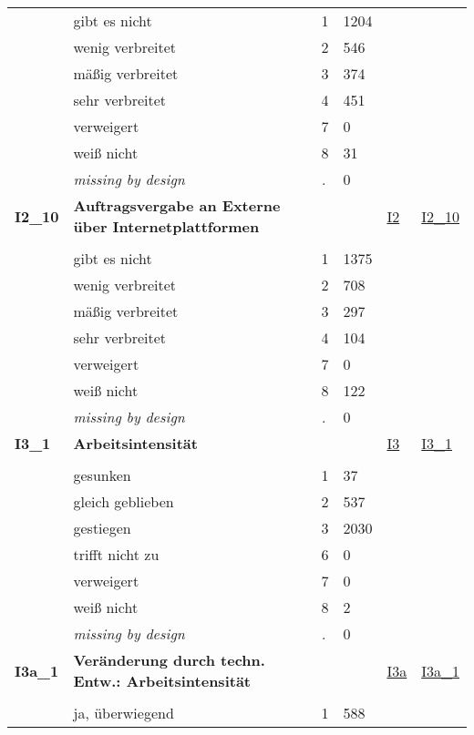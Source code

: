 \begin{longtable}{| L{2.45cm} | L{6cm} | C{1.5cm} | R{1cm} | C{2.25cm} | C{2.25cm} |}
   & gibt es nicht & 1 & 1204 &  &  \\ 
   & wenig verbreitet & 2 & 546 &  &  \\ 
   & mäßig verbreitet & 3 & 374 &  &  \\ 
   & sehr verbreitet & 4 & 451 &  &  \\ 
   & verweigert & 7 & 0 &  &  \\ 
   & weiß nicht & 8 & 31 &  &  \\ 
   & \textit{missing by design} & \textit{.} & 0 &  &  \\ 
   \midrule
\textbf{I2\_10}\label{var:I2:10} & \textbf{Auftragsvergabe an Externe über Internetplattformen} &  &  & \hyperref[I2]{I2} & \hyperref[var:suf:I2:10]{I2\_10} \\ 
   &  &  &  &  &  \\ 
   & gibt es nicht & 1 & 1375 &  &  \\ 
   & wenig verbreitet & 2 & 708 &  &  \\ 
   & mäßig verbreitet & 3 & 297 &  &  \\ 
   & sehr verbreitet & 4 & 104 &  &  \\ 
   & verweigert & 7 & 0 &  &  \\ 
   & weiß nicht & 8 & 122 &  &  \\ 
   & \textit{missing by design} & \textit{.} & 0 &  &  \\ 
   \midrule
\textbf{I3\_1}\label{var:I3:1} & \textbf{Arbeitsintensität} &  &  & \hyperref[I3]{I3} & \hyperref[var:suf:I3:1]{I3\_1} \\ 
   &  &  &  &  &  \\ 
   & gesunken & 1 & 37 &  &  \\ 
   & gleich geblieben & 2 & 537 &  &  \\ 
   & gestiegen & 3 & 2030 &  &  \\ 
   & trifft nicht zu & 6 & 0 &  &  \\ 
   & verweigert & 7 & 0 &  &  \\ 
   & weiß nicht & 8 & 2 &  &  \\ 
   & \textit{missing by design} & \textit{.} & 0 &  &  \\ 
   \midrule
\textbf{I3a\_1}\label{var:I3a:1} & \textbf{Veränderung durch techn. Entw.: Arbeitsintensität} &  &  & \hyperref[I3a]{I3a} & \hyperref[var:suf:I3a:1]{I3a\_1} \\ 
   &  &  &  &  &  \\ 
   & ja, überwiegend & 1 & 588 &  &  \\ 

\end{longtable}
